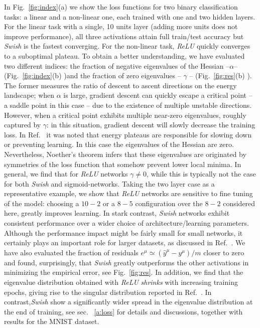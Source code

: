 \documentclass{article}
\begin{document}
In Fig.~\eqref{fig:index}(a) we show the loss functions for two binary classification tasks: a linear and a non-linear one, each trained with one and two hidden layers. For the linear task with a single, 10 units layer (adding more units does not improve performance), all three activations attain full train/test accuracy but {\it Swish} is the fastest converging.  For the non-linear task, {\it ReLU} quickly converges to a suboptimal plateau. To obtain a better understanding, we have evaluated two different indices: the fraction of negative eigenvalues of the Hessian --$\alpha$--(Fig.~\ref{fig:index}(b) )and the fraction of zero eigenvalues -- $\gamma$ --  (Fig.~\ref{fig:res}(b) ). The former measures the ratio of descent to ascent directions on the energy landscape; when $\alpha$ is large, gradient descent can quickly escape a critical point -- a saddle point in this case --  due to the existence of multiple unstable directions. However, when a critical point exhibits multiple near-zero eigenvalues, roughly captured by $\gamma$:%
in this situation, gradient descent will slowly decrease the training loss. In Ref.~\cite{dauphin} it was noted that energy plateaus are responsible for slowing down or preventing learning. In this case the eigenvalues of the Hessian are zero. Nevertheless, Noether's theorem infers that these eigenvalues are originated by symmetries of the loss function that somehow prevent lower local minima. %
In general, we find that  for {\it ReLU} networks $\gamma \neq 0$, while this is typically not the case for both {\it Swish} and sigmoid-networks. Taking the two layer case as a representative example, we show that {\it ReLU} networks are sensitive to fine tuning of the model: choosing a $10-2$ or a $8-5$ configuration over the $8-2$ considered here, greatly improves learning. In stark contrast, {\it Swish} networks exhibit consistent performance over a wider choice of architecture/learning parameters. Although the performance impact might be fairly small for small networks, it certainly plays an important role for larger datasets, as discussed in Ref.~\cite{prajit}.
We have also evaluated the fraction of residuals $e^{\mu} \simeq (\hat{y}^{\mu} - y^{\mu})/m$ closer to zero and found, surprisingly, that {\it Swish} greatly outperforms the other activations in minimizing the empirical error, see Fig.~\eqref{fig:res}.
%
In addition, we find that the eigenvalue distribution obtained with {\it ReLU}  {\it shrinks} with increasing training epochs, giving rise to the singular distribution reported in Ref.~\cite{penn1, levent}. In contrast,{\it Swish} show a significantly wider spread in the eigenvalue distribution at the end of training, see sec. ~\eqref{a:loss} for details and discussions, together with results for the MNIST dataset.
\end{document}
